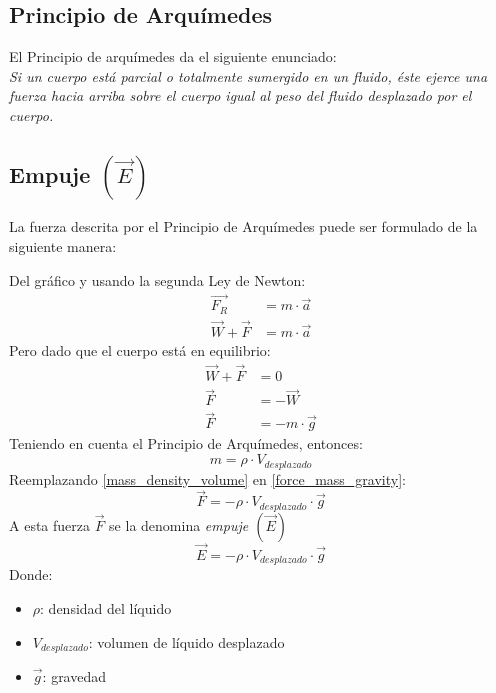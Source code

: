 \documentclass[../main]{subfiles}
\begin{document}
\subsection{Principio de Arquímedes}
El Principio de arquímedes da el siguiente enunciado:\\
\textit{Si un cuerpo está parcial o totalmente sumergido en
un fluido, éste ejerce una fuerza hacia arriba sobre el cuerpo igual al peso del fluido
desplazado por el cuerpo.} \parencite{sears}

\subsection{Empuje $(\vec{E})$}
La fuerza descrita por el Principio de Arquímedes puede ser formulado de la siguiente manera:

Del gráfico y usando la segunda Ley de Newton:
\begin{align*}
    \vec{F_R} &= m \cdot \vec{a} \\
    \vec{W} + \vec{F} &= m \cdot \vec{a}
\end{align*}
Pero dado que el cuerpo está en equilibrio:
\begin{align}
    \vec{W} + \vec{F} &= 0 \nonumber \\
    \vec{F} &= - \vec{W} \nonumber \\
    \label{force_mass_gravity}
    \vec{F} &= - m \cdot \vec{g}
\end{align}
Teniendo en cuenta el Principio de Arquímedes, entonces:
\begin{equation} \label{mass_density_volume}
     m = \rho \cdot V_{desplazado}
\end{equation}
Reemplazando \ref{mass_density_volume} en \ref{force_mass_gravity}:
\begin{equation*}
    \vec{F} = - \rho \cdot V_{desplazado} \cdot \vec{g}
\end{equation*}
A esta fuerza $\vec{F}$ se la denomina \textit{empuje $(\vec{E})$}
\begin{equation}
    \Vec{E} = - \rho \cdot V_{desplazado} \cdot \vec{g}
\end{equation}
Donde:
\begin{itemize}
    \item $\rho$: densidad del líquido
    \item $V_{desplazado}$: volumen de líquido desplazado
    \item $\vec{g}$: gravedad
\end{itemize}
\end{document}
